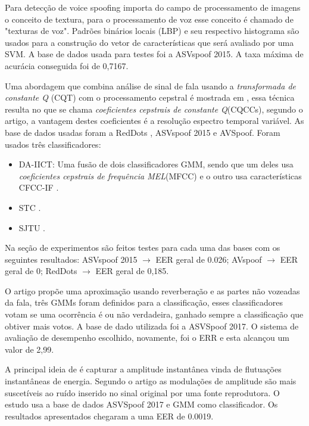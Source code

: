 \documentclass[a4paper,12pt,openright,oneside]{book}
\newenvironment{myenv}[1]
  {\begin{spacing}{#1}}
  {\end{spacing}}
\begin{document}
\begin{myenv}{1.5}
			\par Para detecção de voice spoofing  \cite{ISI:000473343500086} importa do campo de processamento de imagens o conceito de textura, para o processamento de voz esse conceito é chamado de "texturas de voz". Padrões binários locais (LBP) e seu respectivo histograma são usados para a construção do vetor de características que será avaliado por uma SVM. A base de dados usada para testes foi a ASVspoof 2015. A taxa máxima de acurácia conseguida foi de 0,7167.
			
			\par Uma abordagem que combina análise de sinal de fala usando a \textit{transformada de constante Q} (CQT) com o processamento cepstral é mostrada em \cite{TODISCO2017516}, essa técnica resulta no que se chama \textit{coeficientes cepstrais de constante Q}(CQCCs), segundo o artigo, a vantagem destes coeficientes é a resolução espectro temporal variável. As base de dados usadas foram a RedDots \cite{redDots}, ASVspoof 2015 e AVSpoof. Foram usados três classificadores:
			\begin{itemize}
				\item DA-IICT: Uma fusão de dois classificadores GMM, sendo que um deles usa \textit{coeficientes cepstrais de frequência MEL}(MFCC) e o outro usa características CFCC-IF \cite{Patel2015}.
				\item STC \cite{7472724}.
				\item SJTU \cite{korshunov2016overview}.
			\end{itemize}			
			Na seção de experimentos são feitos testes para cada uma das bases com os seguintes resultados: ASVspoof 2015 $\rightarrow$ EER geral de 0.026; AVspoof $\rightarrow$ EER geral de 0; RedDots $\rightarrow$ EER geral de 0,185.

			\par O artigo \cite{ISI:000490497200068} propõe uma aproximação usando reverberação e as partes não vozeadas da fala, três GMMs foram definidos para a classificação, esses classificadores votam se uma ocorrência é ou não verdadeira, ganhado sempre a classificação que obtiver mais votos. A base de dado utilizada foi a ASVSpoof 2017. O sistema de avaliação de desempenho escolhido, novamente, foi o ERR e esta alcançou um valor de 2,99.
			
			\par A principal ideia de \cite{ISI:000465363900136} é capturar a amplitude instantânea vinda de flutuações instantâneas de energia. Segundo o artigo as modulações de amplitude são mais suscetíveis ao ruído inserido no sinal original por uma fonte reprodutora. O estudo usa a base de dados ASVSpoof 2017 e GMM como classificador. Os resultados apresentados chegaram a uma EER de 0.0019.


\end{myenv}
\end{document}
